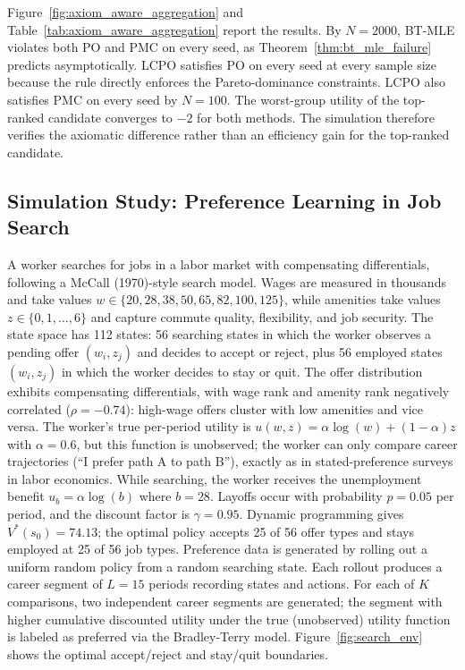Figure~\ref{fig:axiom_aware_aggregation} and Table~\ref{tab:axiom_aware_aggregation} report the results. By $N = 2000$, BT-MLE violates both PO and PMC on every seed, as Theorem~\ref{thm:bt_mle_failure} predicts asymptotically. LCPO satisfies PO on every seed at every sample size because the rule directly enforces the Pareto-dominance constraints. LCPO also satisfies PMC on every seed by $N = 100$. The worst-group utility of the top-ranked candidate converges to $-2$ for both methods. The simulation therefore verifies the axiomatic difference rather than an efficiency gain for the top-ranked candidate.

\subsection{Simulation Study: Preference Learning in Job Search}

A worker searches for jobs in a labor market with compensating differentials, following a McCall (1970)-style search model. Wages are measured in thousands and take values $w \in \{20,28,38,50,65,82,100,125\}$, while amenities take values $z \in \{0, 1, \ldots, 6\}$ and capture commute quality, flexibility, and job security. The state space has 112 states: 56 searching states in which the worker observes a pending offer $(w_i, z_j)$ and decides to accept or reject, plus 56 employed states $(w_i, z_j)$ in which the worker decides to stay or quit. The offer distribution exhibits compensating differentials, with wage rank and amenity rank negatively correlated ($\rho = -0.74$): high-wage offers cluster with low amenities and vice versa. The worker's true per-period utility is $u(w, z) = \alpha \log(w) + (1 - \alpha) z$ with $\alpha = 0.6$, but this function is unobserved; the worker can only compare career trajectories (``I prefer path A to path B''), exactly as in stated-preference surveys in labor economics. While searching, the worker receives the unemployment benefit $u_b = \alpha \log(b)$ where $b = 28$. Layoffs occur with probability $p = 0.05$ per period, and the discount factor is $\gamma = 0.95$. Dynamic programming gives $V^*(s_0) = 74.13$; the optimal policy accepts 25 of 56 offer types and stays employed at 25 of 56 job types. Preference data is generated by rolling out a uniform random policy from a random searching state. Each rollout produces a career segment of $L = 15$ periods recording states and actions. For each of $K$ comparisons, two independent career segments are generated; the segment with higher cumulative discounted utility under the true (unobserved) utility function is labeled as preferred via the Bradley-Terry model. Figure~\ref{fig:search_env} shows the optimal accept/reject and stay/quit boundaries.

